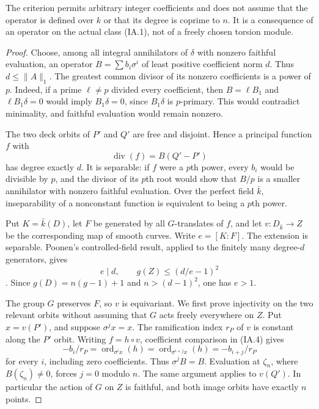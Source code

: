 \documentclass[11pt,a4paper]{article}
\begin{document}
The criterion permits arbitrary integer coefficients and does not
assume that the operator is defined over $k$ or that its degree is
coprime to $n$. It is a consequence of an operator on the actual class
(IA.1), not of a freely chosen torsion module.

\begin{proof}
Choose, among all integral annihilators of $\delta$ with nonzero faithful
evaluation, an operator $B=\sum b_i\sigma^i$ of least positive coefficient
norm $d$. Thus $d\le\|A\|_1$. The greatest common divisor of its nonzero
coefficients is a power of $p$. Indeed, if a prime $\ell\ne p$ divided
every coefficient, then $B=\ell B_1$ and $\ell B_1\delta=0$ would imply
$B_1\delta=0$, since $B_1\delta$ is $p$-primary. This would contradict
minimality, and faithful evaluation would remain nonzero.

The two deck orbits of $P'$ and $Q'$ are free and disjoint. Hence a
principal function $f$ with
\[
                  \operatorname{div}(f)=B(Q'-P')
\tag{IA.4}
\]
has degree exactly $d$. It is separable: if $f$ were a $p$th power,
every $b_i$ would be divisible by $p$, and the divisor of its $p$th root
would show that $B/p$ is a smaller annihilator with nonzero faithful
evaluation. Over the perfect field $\bar k$, inseparability of a
nonconstant function is equivalent to being a $p$th power.

Put $K=\bar k(D)$, let $F$ be generated by all $G$-translates of $f$,
and let $v:D_{\bar k}\to Z$ be the corresponding map of smooth curves.
Write $e=[K:F]$. The extension is separable. Poonen's controlled-field
result, applied to the finitely many degree-$d$ generators, gives
\[
                e\mid d,\qquad g(Z)\le(d/e-1)^2
\tag{IA.5}
\]
\cite[Proposition~2.1, Lemma~2.2 and Corollary~2.3]{Poonen2007Gonality}.
Since $g(D)=n(g-1)+1$ and $n>(d-1)^2$, one has $e>1$.

The group $G$ preserves $F$, so $v$ is equivariant. We first prove
injectivity on the two relevant orbits without assuming that $G$ acts
freely everywhere on $Z$. Put $x=v(P')$, and suppose $\sigma^j x=x$.
The ramification index $r_P$ of $v$ is constant along the $P'$ orbit.
Writing $f=h\circ v$, coefficient comparison in (IA.4) gives
\[
 -b_i/r_P=\operatorname{ord}_{\sigma^i x}(h)
        =\operatorname{ord}_{\sigma^{i+j}x}(h)=-b_{i+j}/r_P
\tag{IA.6}
\]
for every $i$, including zero coefficients. Thus $\sigma^jB=B$.
Evaluation at $\zeta_n$, where $B(\zeta_n)\ne0$, forces $j=0$ modulo
$n$. The same argument applies to $v(Q')$. In particular the action of
$G$ on $Z$ is faithful, and both image orbits have exactly $n$ points.


\end{proof}
\end{document}
